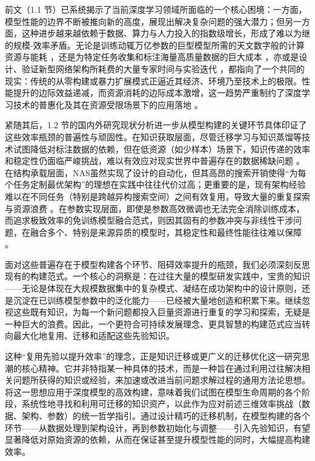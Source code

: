 \documentclass[../main.tex]{subfiles}
\begin{document}
\label{sec:ch1-3-1-efficiency-bottleneck-motivation}

前文（1.1 节）已系统揭示了当前深度学习领域所面临的一个核心困境：一方面，模型性能的边界不断被推向新的高度，展现出解决复杂问题的强大潜力；但另一方面，这种进步越来越依赖于数据、算力与人力投入的指数级增长，形成了难以为继的规模-效率矛盾。无论是训练动辄万亿参数的巨型模型所需的天文数字般的计算资源与能耗 ，还是为特定任务收集和标注海量高质量数据的巨大成本 ，亦或是设计、验证新型网络架构所耗费的大量专家时间与实验迭代 ，都指向了一个共同的现实：传统的从零构建或暴力扩展模式正逼近其经济、环境乃至技术上的极限。性能提升的边际效益递减，而资源消耗的边际成本激增，这一趋势严重制约了深度学习技术的普惠化及其在资源受限场景下的应用落地 。

紧随其后，1.2 节的国内外研究现状分析进一步从模型构建的关键环节具体印证了这些效率瓶颈的普遍性与顽固性。在知识获取层面，尽管迁移学习与知识蒸馏等技术试图降低对标注数据的依赖，但在低资源（如少样本）场景下，知识传递的效率和稳定性仍面临严峻挑战，难以有效应对现实世界中普遍存在的数据稀缺问题 。在结构承载层面，NAS虽然实现了设计的自动化，但其高昂的搜索开销使得“为每个任务定制最优架构”的理想在实践中往往代价过高；更重要的是，现有架构经验难以在不同任务（特别是跨越异构搜索空间）之间有效复用，导致大量的重复探索与资源浪费 。在参数实现层面，即使是参数高效微调也无法完全消除训练成本，而追求极致效率的免训练模型融合范式，则因其固有的参数冲突与非线性干涉问题，在融合多个、特别是来源异质的模型时，其稳定性和最终性能往往难以保障 。

面对这些普遍存在于模型构建各个环节、阻碍效率提升的瓶颈，我们必须深刻反思现有的构建范式。一个核心的洞察是：在过往大量的模型研发实践中，宝贵的知识——无论是体现在大规模数据集中的复杂模式、凝结在成功架构中的设计原则，还是沉淀在已训练模型参数中的泛化能力——已经被大量地创造和积累下来。继续忽视这些既有知识，为每一个新问题都投入巨量资源进行重复的学习和探索，无疑是一种巨大的浪费。因此，一个更符合可持续发展理念、更具智慧的构建范式应当转向最大化地复用、迁移和适配这些先验知识。

这种“复用先验以提升效率”的理念，正是知识迁移或更广义的迁移优化这一研究思潮的核心精神。它并非特指某一种具体的技术，而是一种旨在通过利用过往解决相关问题所获得的知识或经验，来加速或改进当前问题求解过程的通用方法论思想。将这一思想应用于深度模型的高效构建，意味着我们试图在模型生命周期的各个阶段，系统性地寻找和利用可迁移的知识资产，以此作为应对前述三维效率挑战（数据、架构、参数）的统一哲学指引。通过设计精巧的迁移机制，在模型构建的各个环节——从数据处理到架构设计，再到参数初始化与调整——引入先验知识，有望显著降低对原始资源的依赖，从而在保证甚至提升模型性能的同时，大幅提高构建效率。
\end{document}

